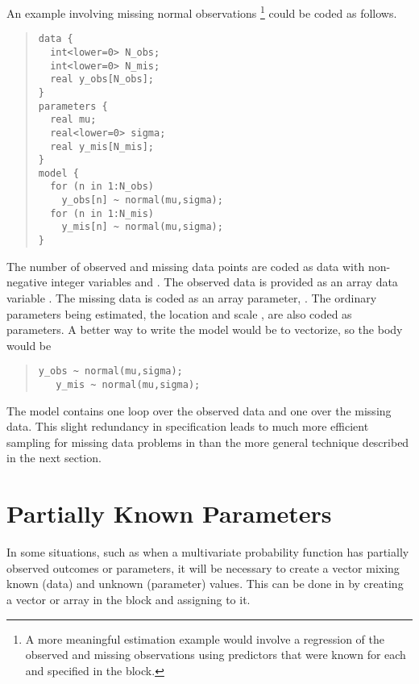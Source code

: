 An example involving missing normal observations%
%
\footnote{A more meaningful estimation example would involve a
  regression of the observed and missing observations using predictors
  that were known for each and specified in the  block.}
%
could be coded as follows.
%
\begin{quote}
\begin{Verbatim}[fontsize=\small]
data {
  int<lower=0> N_obs;
  int<lower=0> N_mis;
  real y_obs[N_obs];
}
parameters {
  real mu;
  real<lower=0> sigma;
  real y_mis[N_mis];
}
model {
  for (n in 1:N_obs)
    y_obs[n] ~ normal(mu,sigma);
  for (n in 1:N_mis)
    y_mis[n] ~ normal(mu,sigma);
}
\end{Verbatim}
\end{quote}
%
The number of observed and missing data points are coded as data with
non-negative integer variables  and .  The
observed data is provided as an array data variable .
The missing data is coded as an array parameter, .  The
ordinary parameters being estimated, the location  and scale
, are also coded as parameters.  A better way to write the
model would be to vectorize, so the body would be
%
\begin{quote}
\begin{Verbatim}[fontsize=\small]
   y_obs ~ normal(mu,sigma);
   y_mis ~ normal(mu,sigma);
\end{Verbatim}
\end{quote}

The model contains one loop over the observed data and one over the
missing data.  This slight redundancy in specification leads to much
more efficient sampling for missing data problems in \Stan than the
more general technique described in the next section.


\section{Partially Known Parameters}\label{partially-known-parameters.section}

In some situations, such as when a multivariate probability function
has partially observed outcomes or parameters, it will be necessary to
create a vector mixing known (data) and unknown (parameter) values.
This can be done in \Stan by creating a vector or array in the
 block and assigning to it.

